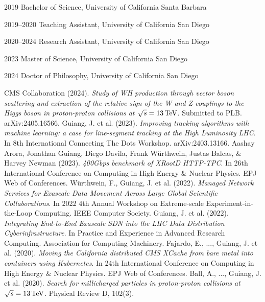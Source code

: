 \begin{vita}
\noindent
\begin{cv}{}
\begin{cvlist}{}
\item[2019] Bachelor of Science, University of California Santa Barbara
\item[2019--2020] Teaching Assistant, University of California San Diego
\item[2020--2024] Research Assistant, University of California San Diego
\item[2023] Master of Science, University of California San Diego
\item[2024] Doctor of Philosophy, University of California San Diego
\end{cvlist}
\end{cv}

\publications
\noindent CMS Collaboration (2024). 
\textit{Study of WH production through vector boson scattering and extraction of the relative sign of the W and Z couplings to the Higgs boson in proton-proton collisions at $\sqrt{s} = 13\,\text{Te\hspace{-.08em}V}$}. 
Submitted to PLB. arXiv:2405.16566.
\newline
\newline
\noindent Guiang, J. et al. (2023). 
\textit{Improving tracking algorithms with machine learning: a case for line-segment tracking at the High Luminosity LHC}. 
In 8th International Connecting The Dots Workshop. arXiv:2403.13166.
\newline
\newline
\noindent Aashay Arora, Jonathan Guiang, Diego Davila, Frank W\"{u}rthwein, Justas Balcas, \& Harvey Newman (2023). 
\textit{400Gbps benchmark of XRootD HTTP-TPC}. 
In 26th International Conference on Computing in High Energy \& Nuclear Physics. EPJ Web of Conferences.
\newline
\newline
\noindent W\"{u}rthwein, F., Guiang, J. et al. (2022). 
\textit{Managed Network Services for Exascale Data Movement Across Large Global Scientific Collaborations}. 
In 2022 4th Annual Workshop on Extreme-scale Experiment-in-the-Loop Computing. IEEE Computer Society.
\newline
\newline
\noindent Guiang, J. et al. (2022). 
\textit{Integrating End-to-End Exascale SDN into the LHC Data Distribution Cyberinfrastructure}. 
In Practice and Experience in Advanced Research Computing. Association for Computing Machinery.
\newline
\newline
\noindent Fajardo, E., ..., Guiang, J. et al. (2020). 
\textit{Moving the California distributed CMS XCache from bare metal into containers using Kubernetes}. 
In 24th International Conference on Computing in High Energy \& Nuclear Physics. EPJ Web of Conferences.
\newline
\newline
\noindent Ball, A., ..., Guiang, J. et al. (2020). 
\textit{Search for millicharged particles in proton-proton collisions at $\sqrt{s} = 13\,\text{Te\hspace{-.08em}V}$}. 
Physical Review D, 102(3).
\end{vita}
